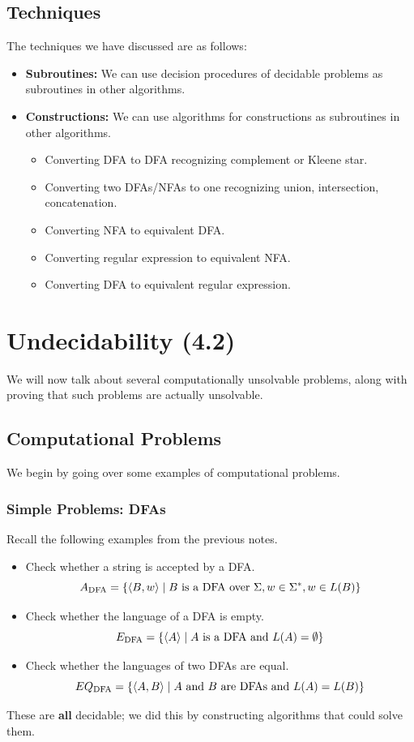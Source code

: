\documentclass[letterpaper]{article}
\begin{document}
\subsection{Techniques}
The techniques we have discussed are as follows: 
\begin{itemize}
    \item \textbf{Subroutines:} We can use decision procedures of decidable problems as subroutines in other algorithms. 
    \item \textbf{Constructions:} We can use algorithms for constructions as subroutines in other algorithms.
    \begin{itemize}
        \item Converting DFA to DFA recognizing complement or Kleene star. 
        \item Converting two DFAs/NFAs to one recognizing union, intersection, concatenation. 
        \item Converting NFA to equivalent DFA. 
        \item Converting regular expression to equivalent NFA. 
        \item Converting DFA to equivalent regular expression.
    \end{itemize}
\end{itemize}










\newpage 
\section{Undecidability (4.2)} 
We will now talk about several computationally unsolvable problems, along with proving that such problems are actually unsolvable.

\subsection{Computational Problems}
We begin by going over some examples of computational problems. 

\subsubsection{Simple Problems: DFAs}
Recall the following examples from the previous notes. 
\begin{itemize}
    \item Check whether a string is accepted by a DFA. 
    \[A_{\text{DFA}} = \{\langle B, w \rangle \mid B \text{ is a DFA over } \Sigma, w \in \Sigma^*, w \in L(B)\}\]

    \item Check whether the language of a DFA is empty. 
    \[E_{\text{DFA}} = \{\langle A \rangle \mid A \text{ is a DFA and } L(A) = \emptyset\}\]
    
    \item Check whether the languages of two DFAs are equal.
    \[EQ_{\text{DFA}} = \{\langle A, B \rangle \mid A \text{ and } B \text{ are DFAs and } L(A) = L(B)\}\]
\end{itemize}
These are \textbf{all} decidable; we did this by constructing algorithms that could solve them. 
\end{document}
